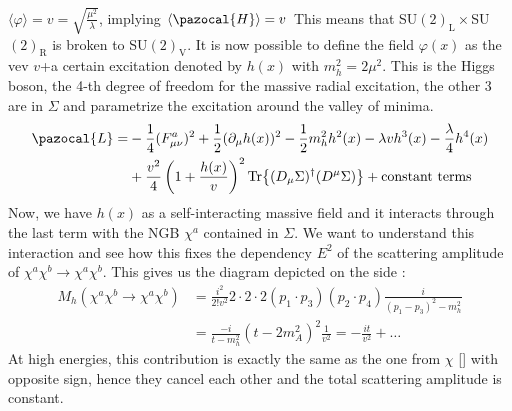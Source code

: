 \documentclass[../main.tex]{subfiles}
\begin{document}
$\langle\varphi\rangle=v=\sqrt{\frac{\mu^2}{\lambda}}$, implying $\langle\pazocal{H}\rangle=v$ This means that SU$(2)_{\text{L}}\times$SU$(2)_{\text{R}}$ is broken to SU$(2)_{\text{V}}$. It is now possible to define the field $\varphi(x)$ as the vev $v$+a certain excitation denoted by $h(x)$ with $m_h^2=2\mu^2$. This is the Higgs boson, the 4-th degree of freedom for the massive radial excitation, the other 3 are in $\Sigma$ and parametrize the excitation around the valley of minima.
\begin{align*}
\pazocal{L}=&-\frac{1}{4}(F_{\mu\nu}^a)^2+\frac{1}{2}(\partial_\mu h(x))^2-\frac{1}{2}m_h^2h^2(x)-\lambda vh^3(x)-\frac{\lambda}{4}h^4(x)\\
&+\frac{v^2}{4}\left(1+\frac{h(x)}{v}\right)^2\Tr{(D_\mu\Sigma)^\dagger(D^\mu\Sigma)}+\text{constant terms}
\end{align*}
Now, we have $h(x)$ as a self-interacting massive field and it interacts through the last term with the NGB $\chi^a$ contained in $\Sigma$. We want to understand this interaction and see how this fixes the dependency $E^2$ of the scattering amplitude of $\chi^a\chi^b\to\chi^a\chi^b$. This gives us the diagram depicted on the side :
\begin{align*}
M_h(\chi^a\chi^b\to\chi^a\chi^b)&=\frac{i^2}{2!v^2}2\cdot2\cdot2(p_1\cdot p_3)(p_2\cdot p_4)\frac{i}{(p_1-p_3)^2-m_h^2}\\
&=\frac{-i}{t-m_h^2}(t-2m_A^2)^2\frac{1}{v^2}=-\frac{it}{v^2}+\dots
\end{align*}
At high energies, this contribution is exactly the same as the one from $\chi$ [] with opposite sign, hence they cancel each other and the total scattering amplitude is constant. 
\end{document}

